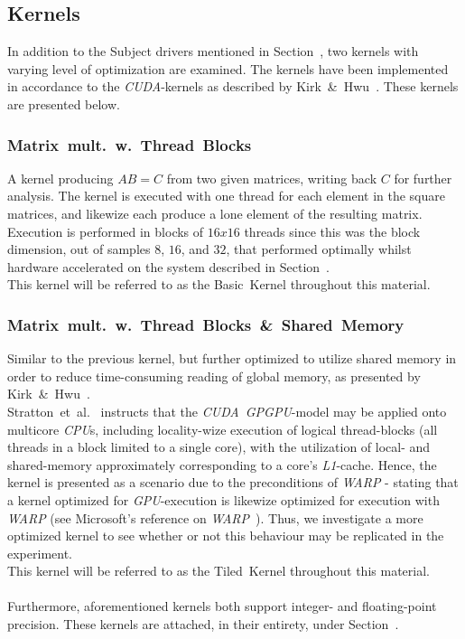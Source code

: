 \subsection{Kernels}
\label{sec:contribution:kernels}
In addition to the Subject drivers mentioned in Section~, two kernels with varying level of optimization are examined.
The kernels have been implemented in accordance to the \textit{CUDA}-kernels as described by Kirk~\&~Hwu~\cite[p.~67, p.~87]{Kirk:2010:PMP:1841511}.
These kernels are presented below.
\subsubsection{Matrix~mult.~w.~Thread~Blocks}
A kernel producing $AB=C$ from two given matrices, writing back $C$ for further analysis.
The kernel is executed with one thread for each element in the square matrices, and likewize each produce a lone element of the resulting matrix. Execution is performed in blocks of $16x16$ threads since this was the block dimension, out of samples $8$, $16$, and $32$, that performed optimally whilst hardware accelerated on the system described in Section~.\\
This kernel will be referred to as the Basic~Kernel throughout this material.

\subsubsection{Matrix~mult.~w.~Thread~Blocks~\&~Shared~Memory}
Similar to the previous kernel, but further optimized to utilize shared memory in order to reduce time-consuming reading of global memory, as presented by Kirk~\&~Hwu~\cite[p.~77-93]{Kirk:2010:PMP:1841511}.\\
Stratton~et~al.~\cite[p.~1-3]{Stratton:2008:MEI:1485701.1485703} instructs that the \textit{CUDA}~\textit{GPGPU}-model may be applied onto multicore \textit{CPU}s, including locality-wize execution of logical thread-blocks (all threads in a block limited to a single core), with the utilization of local- and shared-memory approximately corresponding to a core's \textit{L1}-cache. Hence, the kernel is presented as a scenario due to the preconditions of \textit{WARP} - stating that a kernel optimized for \textit{GPU}-execution is likewize optimized for execution with \textit{WARP} (see Microsoft's reference on \textit{WARP}~).
Thus, we investigate a more optimized kernel to see whether or not this behaviour may be replicated in the experiment.\\
This kernel will be referred to as the Tiled~Kernel throughout this material.\\
\\
Furthermore, aforementioned kernels both support integer- and floating-point precision.
These kernels are attached, in their entirety, under Section~.

